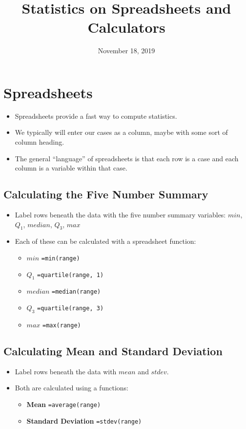 \documentclass{article}
\title{Statistics on Spreadsheets and Calculators}
\date{November 18, 2019}
\begin{document}
\maketitle

\section{Spreadsheets}
\begin{itemize}
\item Spreadsheets provide a fast way to compute statistics.
\item We typically will enter our cases as a column, maybe with some
    sort of column heading.
\item The general ``language'' of spreadsheets is that each row is
    a case and each column is a variable within that case.
\end{itemize}


\subsection{Calculating the Five Number Summary}
\begin{itemize}
\item Label rows beneath the data with the five number summary
    variables: $min$, $Q_1$, $median$, $Q_3$, $max$
\item Each of these can be calculated with a spreadsheet function:
    \begin{itemize}
    \item \textbf{$min$}  \verb!=min(range)!
    \item \textbf{$Q_1$}  \verb!=quartile(range, 1)!
    \item \textbf{$median$}  \verb!=median(range)!
    \item \textbf{$Q_3$}  \verb!=quartile(range, 3)!
    \item \textbf{$max$}  \verb!=max(range)!
    \end{itemize}
\end{itemize}

\subsection{Calculating Mean and Standard Deviation}
\begin{itemize}
\item Label rows beneath the data with $mean$ and $stdev$.
\item Both are calculated using a functions:
    \begin{itemize}
    \item \textbf{Mean}  \verb!=average(range)!
    \item \textbf{Standard Deviation}  \verb!=stdev(range)!
    \end{itemize}
\end{itemize}
\end{document}
